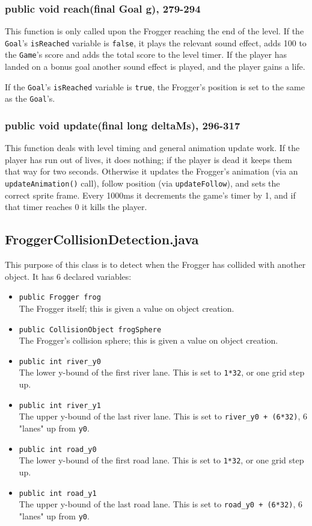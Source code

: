 \documentclass[12pt]{article}
\begin{document}
\subsubsection{public void reach(final Goal g), 279-294}
This function is only called upon the Frogger reaching the end of the level.
If the \verb|Goal|'s \verb|isReached| variable is \verb|false|, it plays the relevant sound effect, adds 100 to the \verb|Game|'s score and adds the total score to the level timer.
If the player has landed on a bonus goal another sound effect is played, and the player gains a life.
\par
If the \verb|Goal|'s \verb|isReached| variable is \verb|true|, the Frogger's position is set to the same as the \verb|Goal|'s.

\subsubsection{public void update(final long deltaMs), 296-317}
This function deals with level timing and general animation update work.
If the player has run out of lives, it does nothing; if the player is dead it keeps them that way for two seconds.
Otherwise it updates the Frogger's animation (via an \verb|updateAnimation()| call), follow position (via \verb|updateFollow|), and sets the correct sprite frame.
Every 1000ms it decrements the game's timer by 1, and if that timer reaches 0 it kills the player.


\subsection{FroggerCollisionDetection.java}
This purpose of this class is to detect when the Frogger has collided with another object.
It has 6 declared variables:
\begin{itemize}
  \item \verb|public Frogger frog|\\
        The Frogger itself; this is given a value on object creation.
  \item \verb|public CollisionObject frogSphere|\\
        The Frogger's collision sphere; this is given a value on object creation.
  \item \verb|public int river_y0|\\
        The lower y-bound of the first river lane.
        This is set to \verb|1*32|, or one grid step up.
  \item \verb|public int river_y1|\\
        The upper y-bound of the last river lane.
        This is set to \verb|river_y0 + (6*32)|, 6 "lanes" up from \verb|y0|.
  \item \verb|public int road_y0|\\
        The lower y-bound of the first road lane.
        This is set to \verb|1*32|, or one grid step up.
  \item \verb|public int road_y1|\\
        The upper y-bound of the last road lane.
        This is set to \verb|road_y0 + (6*32)|, 6 "lanes" up from \verb|y0|.
\end{itemize}
\end{document}
